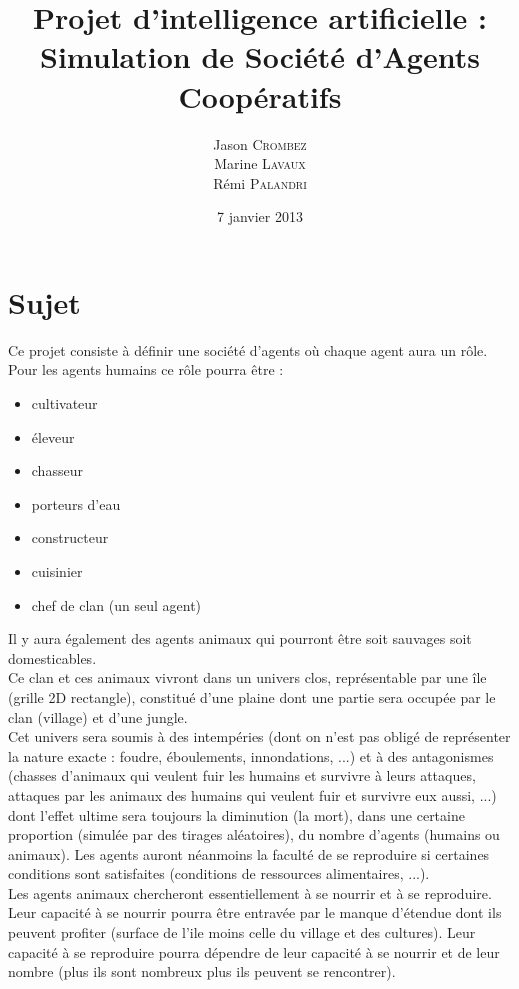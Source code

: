 \documentclass[12pt]{article}
\date{7 janvier 2013}
\title{Projet d'intelligence artificielle :\\Simulation de Société d'Agents Coopératifs}
\author{Jason \textsc{Crombez} \\ Marine \textsc{Lavaux} \\ Rémi \textsc{Palandri}}
\begin{document}
	
\maketitle

\newpage
	
\section{Sujet}
	
Ce projet consiste à définir une société d'agents où chaque agent aura un rôle.
Pour les agents humains ce rôle pourra être :\\

	\begin{itemize}

	\item cultivateur
    	\item éleveur
    	\item chasseur
    	\item porteurs d'eau
    	\item constructeur
    	\item cuisinier
    	\item chef de clan (un seul agent)\\

	\end{itemize}

Il y aura également des agents animaux qui pourront être soit sauvages soit 
domesticables.\\

Ce clan et ces animaux vivront dans un univers clos, représentable par une île 
(grille 2D rectangle), constitué d'une plaine dont une partie sera occupée par 
le clan (village) et d'une jungle.\\

Cet univers sera soumis à des intempéries (dont on n'est pas obligé de 
représenter la nature exacte : foudre, éboulements, innondations, ...) et à des 
antagonismes (chasses d'animaux qui veulent fuir les humains et survivre à 
leurs attaques, attaques par les animaux des humains qui veulent fuir et 
survivre eux aussi, ...) dont l'effet ultime sera toujours la diminution (la 
mort), dans une certaine proportion (simulée par des tirages aléatoires), du 
nombre d'agents (humains ou animaux). Les agents auront néanmoins la faculté 
de se reproduire si certaines conditions sont satisfaites (conditions de 
ressources alimentaires, ...).\\

Les agents animaux chercheront essentiellement à se nourrir et à se reproduire. 
Leur capacité à se nourrir pourra être entravée par le manque d'étendue dont 
ils peuvent profiter (surface de l'ile moins celle du village et des cultures). 
Leur capacité à se reproduire pourra dépendre de leur capacité à se nourrir et 
de leur nombre (plus ils sont nombreux plus ils peuvent se rencontrer).\\
\end{document}

